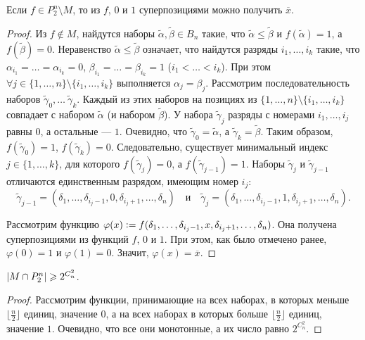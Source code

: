 \begin{lemma}
    Если $f \in P_2^n \setminus M$, то из $f$, $0$ и $1$ суперпозициями можно получить $\overline{x}$.
\end{lemma}

\begin{proof}
    Из $f \notin M$, найдутся наборы $\widetilde{\alpha}, \widetilde{\beta} \in B_n$ такие, что $\widetilde{\alpha} \leqslant \widetilde{\beta}$ и $f(\widetilde{\alpha}) = 1$, а $f(\widetilde{\beta}) = 0$. Неравенство $\widetilde{\alpha} \leqslant \widetilde{\beta}$ означает, что найдутся разряды $i_1, \ldots, i_k$ такие, что $\alpha_{i_1} = \ldots = \alpha_{i_k} = 0$, $\beta_{i_1} = \ldots = \beta_{i_k} = 1$ ($i_1 < \ldots < i_k$). При этом $\forall j \in \{1, \ldots, n\} \setminus \{i_1, \ldots, i_k\}$ выполняется $\alpha_j = \beta_j$. Рассмотрим последовательность наборов $\widetilde{\gamma}_0, \ldots\ \widetilde{\gamma}_k$. Каждый из этих наборов на позициях из $\{1, \ldots, n\} \setminus \{i_1, \ldots, i_k\}$ совпадает с набором $\widetilde{\alpha}$ (и набором $\widetilde{\beta}$). У набора $\widetilde{\gamma}_j$ разряды с номерами $i_1, \ldots, i_j$ равны $0$, а остальные --- $1$. Очевидно, что $\widetilde{\gamma}_0 = \widetilde{\alpha}$, а $\widetilde{\gamma}_k = \widetilde{\beta}$. Таким образом, $f(\widetilde{\gamma}_0) = 1$, $f(\widetilde{\gamma}_k) = 0$. Следовательно, существует минимальный индекс $j \in \{1, \ldots, k\}$, для которого $f(\widetilde{\gamma}_j) = 0$, а $f(\widetilde{\gamma}_{j - 1}) = 1$. Наборы $\widetilde{\gamma}_j$ и $\widetilde{\gamma}_{j - 1}$ отличаются единственным разрядом, имеющим номер $i_j$:
    \[
        \widetilde{\gamma}_{j - 1} = (\delta_1, \ldots, \delta_{i_j - 1}, 0, \delta_{i_j + 1}, \ldots, \delta_n)\quad\text{и}\quad\widetilde{\gamma}_j = (\delta_1, \ldots, \delta_{i_j - 1}, 1, \delta_{i_j + 1}, \ldots, \delta_n).
    \]

    Рассмотрим функцию $\varphi(x) \vcentcolon = f(\delta_1, \ldots, \delta_{i_j - 1}, x, \delta_{i_j + 1}, \ldots, \delta_n)$. Она получена суперпозициями из функций $f$, $0$ и $1$. При этом, как было отмечено ранее, $\varphi(0) = 1$ и $\varphi(1) = 0$. Значит, $\varphi(x) = \overline{x}$.
\end{proof}

\begin{proposal}
    $\left\lvert M \cap P_2^n\right\rvert \geqslant 2^{C_n^2}$.
\end{proposal}

\begin{proof}
    Рассмотрим функции, принимающие на всех наборах, в которых меньше $\lfloor\frac{n}{2}\rfloor$ единиц, значение $0$, а на всех наборах в которых больше $\lfloor\frac{n}{2}\rfloor$ единиц, значение $1$. Очевидно, что все они монотонные, а их число равно $2^{C_n^2}$.
\end{proof}

